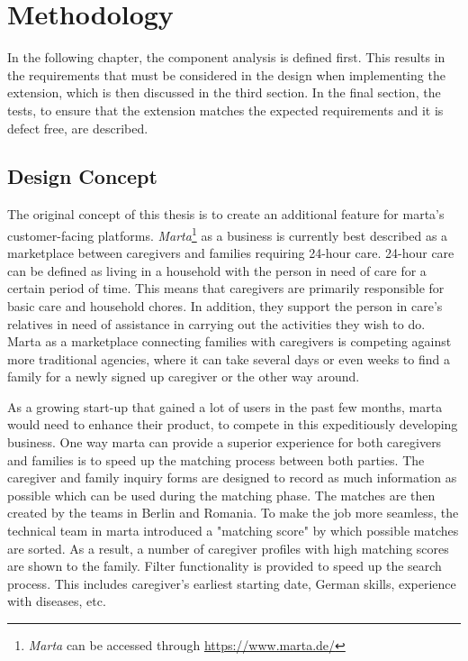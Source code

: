 \newpage
\chapter{Methodology}
In the following chapter, the component analysis is defined first. This results in the requirements that must be considered in the design when implementing the extension, which is then discussed in the third section. In the final section, the tests, to ensure that the extension matches the expected requirements and it is defect free, are described.

\section{Design Concept}
The original concept of this thesis is to create an additional feature for marta's customer-facing platforms. \emph{Marta}\footnote{\emph{Marta} can be accessed through \url{https://www.marta.de/}} as a business is currently best described as a marketplace between caregivers and families requiring 24-hour care. 24-hour care can be defined as living in a household with the person in need of care for a certain period of time. This means that caregivers are primarily responsible for basic care and household chores. In addition, they support the person in care's relatives in need of assistance in carrying out the activities they wish to do. Marta as a marketplace connecting families with caregivers is competing against more traditional agencies, where it can take several days or even weeks to find a family for a newly signed up caregiver or the other way around.

As a growing start-up that gained a lot of users in the past few months, marta would need to enhance their product, to compete in this expeditiously developing business. One way marta can provide a superior experience for both caregivers and families is to speed up the matching process between both parties. The caregiver and family inquiry forms are designed to record as much information as possible which can be used during the matching phase. The matches are then created by the teams in Berlin and Romania. To make the job more seamless, the technical team in marta introduced a "matching score" by which possible matches are sorted. As a result, a number of caregiver profiles with high matching scores are shown to the family. Filter functionality is provided to speed up the search process. This includes caregiver's earliest starting date, German skills, experience with diseases, etc.

